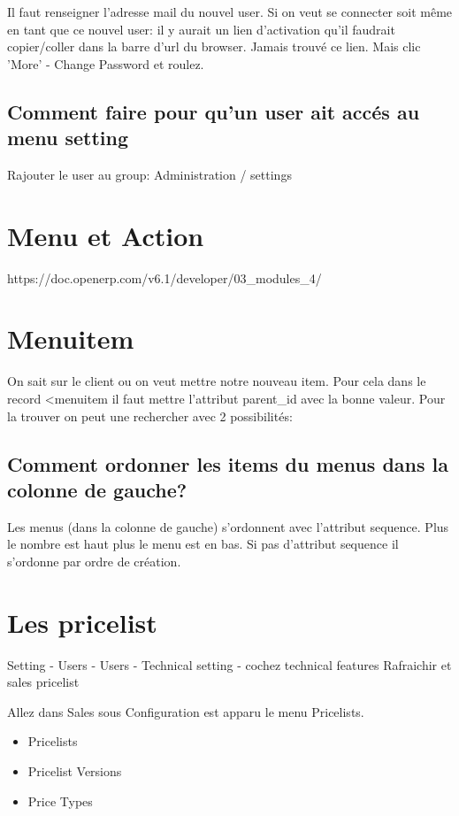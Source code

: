 \documentclass[12pt,a4paper]{article}
\begin{document}
Il faut renseigner l'adresse mail  du nouvel user. 
Si on veut se connecter soit même en tant que ce nouvel user: il y aurait un lien d'activation qu'il faudrait copier/coller dans la barre d'url du browser. Jamais trouvé ce lien.
Mais clic 'More' - Change Password et roulez. 

\subsection{Comment faire pour qu'un user ait accés au menu setting}
\label{sec:menu_setting}

Rajouter le user au group: Administration / settings


\section{Menu et Action}
\label{sec:menu}

https://doc.openerp.com/v6.1/developer/03\_modules\_4/
\section{Menuitem}
\label{menuitem}
On sait sur le client ou on veut mettre notre nouveau item. Pour cela dans le
record <menuitem il faut mettre l'attribut parent\_id avec la bonne valeur. Pour
la trouver on peut une rechercher avec 2 possibilités:


\subsection{ Comment ordonner les items du menus dans la colonne de gauche?}
\label{sec:itemorder}
Les menus (dans la colonne de gauche) s’ordonnent avec l’attribut sequence. Plus le nombre est haut plus le menu est en bas. Si pas
d’attribut sequence il s’ordonne par ordre de création.

\section{Les pricelist}
\label{sec:princelit}

Setting - Users - Users - Technical setting - cochez technical features Rafraichir  et sales pricelist

Allez dans Sales sous Configuration est apparu le menu Pricelists. 
\begin{itemize}
\item Pricelists
\item Pricelist Versions
\item Price Types
\end{itemize}
\end{document}
